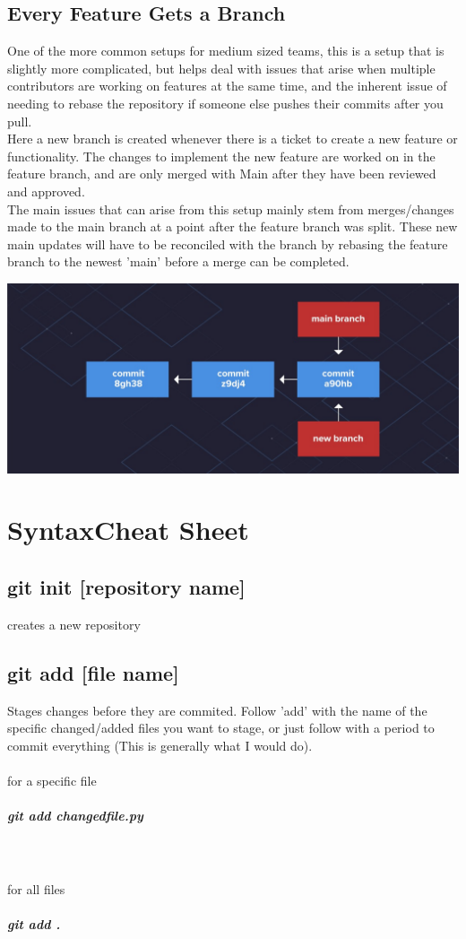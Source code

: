 \documentclass{article}
\begin{document}
\subsection{Every Feature Gets a Branch}
One of the more common setups for medium sized teams, this is a setup that is slightly more complicated, but helps deal with issues that arise when multiple contributors are working on features at the same time, and the inherent issue of needing to rebase the repository if someone else pushes their commits after you pull. \\
Here a new branch is created whenever there is a ticket to create a new feature or functionality. The changes to implement the new feature are worked on in the feature branch, and are only merged with Main after they have been reviewed and approved. \\
The main issues that can arise from this setup mainly stem from merges/changes made to the main branch at a point after the feature branch was split. These new main updates will have to be reconciled with the branch by rebasing the feature branch to the newest 'main' before a merge can be completed.

\begin{center}
\includegraphics[width=\textwidth]{merge_picture.jpg}
\end{center}

\section{SyntaxCheat Sheet}
\subsection{git init [repository name]}
creates a new repository
\subsection{git add [file name]}
Stages changes before they are commited. Follow 'add' with the name of the specific changed/added files you want to stage, or just follow with a period to commit everything (This is generally what I would do). \\ \\
for a specific file
\subparagraph{git add changedfile.py} \mbox{}\\
\\ for all files 
\subparagraph{git add .}
\end{document}
